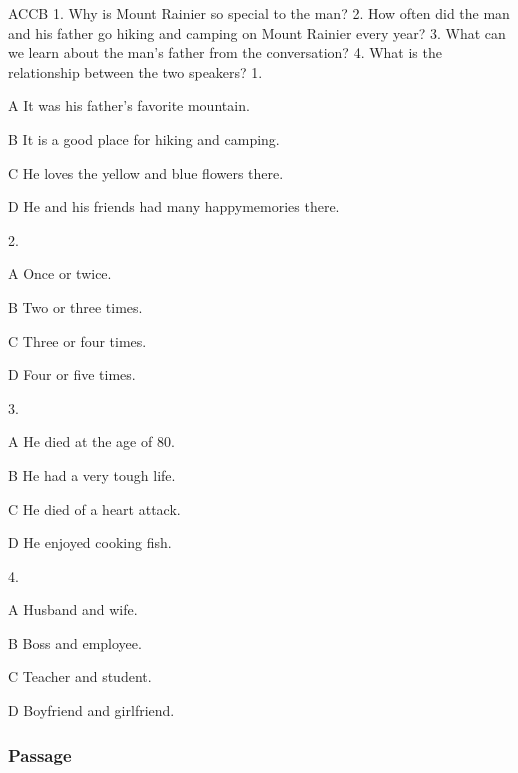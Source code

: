 \begin{enumerate}
	ACCB
	1. Why is Mount Rainier so special to the man?
	2. How often did the man and his father go hiking and camping on Mount Rainier every year?
	3. What can we learn about the man's father from the conversation?
	4. What is the relationship between the two speakers?
	1.
	
	A
	It was his father's favorite mountain.
	
	B
	It is a good place for hiking and camping.
	
	C
	He loves the yellow and blue flowers there.
	
	D
	He and his friends had many happymemories there.
	
	2.
	
	A
	Once or twice.
	
	B
	Two or three times.
	
	C
	Three or four times.
	
	D
	Four or five times.
	
	3.
	
	A
	He died at the age of 80.
	
	B
	He had a very tough life.
	
	C
	He died of a heart attack.
	
	D
	He enjoyed cooking fish.
	
	4.
	
	A
	Husband and wife.
	
	B
	Boss and employee.
	
	C
	Teacher and student.
	
	D
	Boyfriend and girlfriend.
\end{enumerate}


\subsubsection{Passage}

